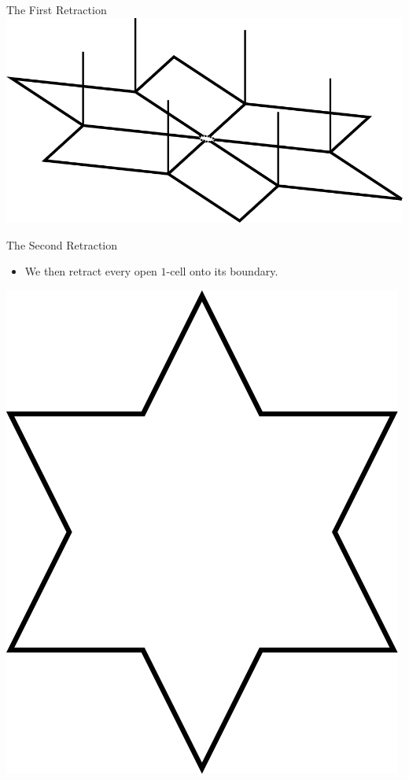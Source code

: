 \documentclass{beamer}
\begin{document}
\begin{frame}{The First Retraction}
\centering
\includegraphics[scale=.6]{Thesis/NoInt.png}
\end{frame}

\begin{frame}{The Second Retraction}
\begin{itemize}
\item We then retract every open $1$-cell onto its boundary.\pause
\end{itemize}

\centering
\includegraphics[scale=.5]{Thesis/discretized.png}
\end{frame}
\end{document}
